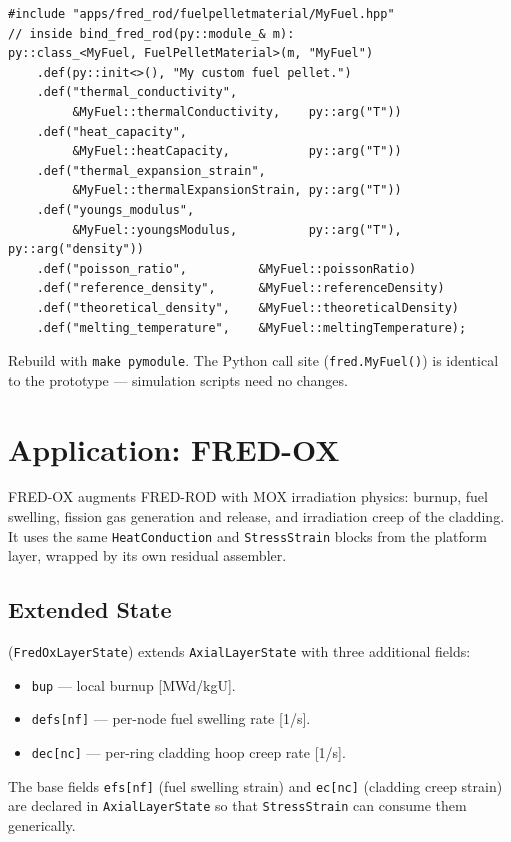 \documentclass[11pt,a4paper]{article}
\begin{document}
\begin{lstlisting}
#include "apps/fred_rod/fuelpelletmaterial/MyFuel.hpp"
// inside bind_fred_rod(py::module_& m):
py::class_<MyFuel, FuelPelletMaterial>(m, "MyFuel")
    .def(py::init<>(), "My custom fuel pellet.")
    .def("thermal_conductivity",
         &MyFuel::thermalConductivity,    py::arg("T"))
    .def("heat_capacity",
         &MyFuel::heatCapacity,           py::arg("T"))
    .def("thermal_expansion_strain",
         &MyFuel::thermalExpansionStrain, py::arg("T"))
    .def("youngs_modulus",
         &MyFuel::youngsModulus,          py::arg("T"), py::arg("density"))
    .def("poisson_ratio",          &MyFuel::poissonRatio)
    .def("reference_density",      &MyFuel::referenceDensity)
    .def("theoretical_density",    &MyFuel::theoreticalDensity)
    .def("melting_temperature",    &MyFuel::meltingTemperature);
\end{lstlisting}

Rebuild with \texttt{make pymodule}.  The Python call site (\texttt{fred.MyFuel()}) is identical to the prototype --- simulation scripts need no changes.

\section{Application: FRED-OX}
\label{sec:fred_ox}

FRED-OX augments FRED-ROD with MOX irradiation physics: burnup, fuel swelling, fission gas generation and release, and irradiation creep of the cladding.  It uses the same \texttt{HeatConduction} and \texttt{StressStrain} blocks from the platform layer, wrapped by its own residual assembler.

\subsection{Extended State}
\label{sec:ox_state}

 (\texttt{FredOxLayerState}) extends \texttt{AxialLayerState} with three additional fields:
\begin{itemize}
  \item \texttt{bup} — local burnup [MWd/kgU].
  \item \texttt{defs[nf]} — per-node fuel swelling rate [1/s].
  \item \texttt{dec[nc]} — per-ring cladding hoop creep rate [1/s].
\end{itemize}
The base fields \texttt{efs[nf]} (fuel swelling strain) and \texttt{ec[nc]} (cladding creep strain) are declared in \texttt{AxialLayerState} so that \texttt{StressStrain} can consume them generically.
\end{document}
